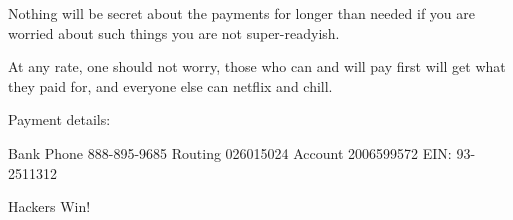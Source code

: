 \documentclass[11pt,letterpaper]{article}
\begin{document}
Nothing will be secret about the payments for longer than needed if you are
worried about such things you are not super-readyish.

At any rate, one should not worry, those who can and will pay first will get
what they paid for, and everyone else can netflix and chill.

Payment details:

Bank Phone 888-895-9685
Routing 026015024
Account 2006599572
EIN: 93-2511312

Hackers Win!
\end{document}

